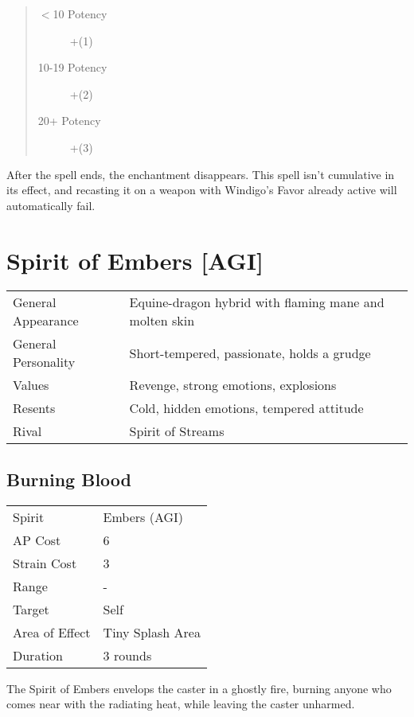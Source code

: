 \documentclass[11pt,a4paper,twocolumn]{book}
\begin{document}
\begin{quote}
	\begin{description}
		\item[$<$10 Potency] 	+(1)
		\item[10-19 Potency] 	+(2)
		\item[20+ Potency] 	    +(3)
	\end{description}
\end{quote}

After the spell ends, the enchantment disappears. This spell isn't cumulative in its effect, and recasting it on a weapon with Windigo's Favor already active will automatically fail.

\section*{Spirit of Embers [AGI]}
{
	\begin{tabu} to 75mm{| X[l,4] | X[l,8] |}
		\hline
		General Appearance  & Equine-dragon hybrid with flaming mane and molten skin \\
		General Personality & Short-tempered, passionate, holds a grudge             \\
		Values              & Revenge, strong emotions, explosions                   \\
		Resents             & Cold, hidden emotions, tempered attitude               \\
		Rival               & Spirit of Streams                                      \\ \hline
	\end{tabu}
	
}

\medskip

\subsection*{Burning Blood}
{
	\begin{tabu} to 75mm{| X[l,4] | X[l,7] |}
		\hline
		Spirit         & Embers (AGI)     \\
		AP Cost        & 6                \\
		Strain Cost    & 3                \\
		Range          & -                \\
		Target         & Self             \\
		Area of Effect & Tiny Splash Area \\
		Duration       & 3 rounds         \\ \hline
	\end{tabu}
	
}
\medskip
The Spirit of Embers envelops the caster in a ghostly fire, burning anyone who comes near with the radiating heat, while leaving the caster unharmed.
\end{document}
